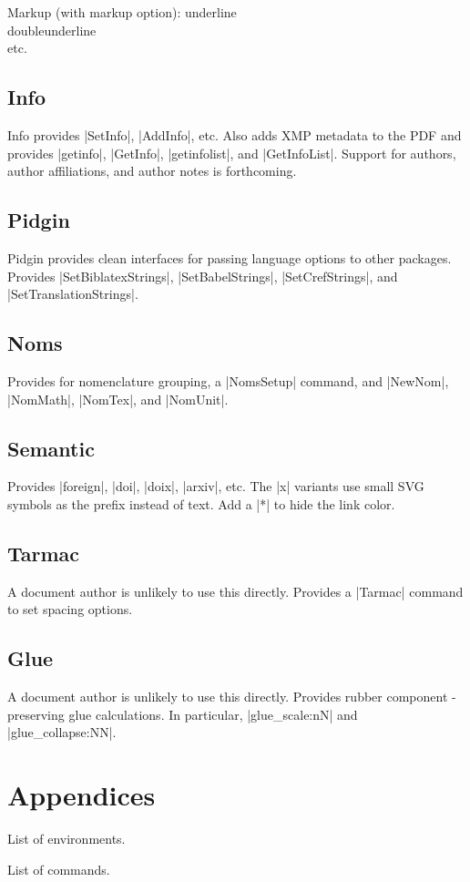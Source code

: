 Markup (with markup option):
underline\\
doubleunderline\\
etc.\\


\section{Info}

Info provides \term|SetInfo|, \term|AddInfo|, etc.
Also adds XMP metadata to the PDF and provides \term|getinfo|, \term|GetInfo|,
\term|getinfolist|, and \term|GetInfoList|.
Support for authors, author affiliations, and author notes is forthcoming.


\section{Pidgin}

Pidgin provides clean interfaces for passing language options to other packages.
Provides \term|SetBiblatexStrings|, \term|SetBabelStrings|, \term|SetCrefStrings|,
and \term|SetTranslationStrings|.


\section{Noms}

Provides for nomenclature grouping, a \term|NomsSetup| command, and 
\term|NewNom|, \term|NomMath|, \term|NomTex|, and \term|NomUnit|.


\section{Semantic}

Provides \term|foreign|, \term|doi|, \term|doix|, \term|arxiv|, etc.
The \term|x| variants use small SVG symbols as the prefix instead of text.
Add a \term|*| to hide the link color.


\section{Tarmac}

A document author is unlikely to use this directly.
Provides a \term|Tarmac| command to set spacing options.


\section{Glue}

A document author is unlikely to use this directly.
Provides rubber component -preserving glue calculations.
In particular, \term|glue\_scale:nN| and \term|glue\_collapse:NN|.



\chapter{Appendices}

List of environments.

List of commands.

